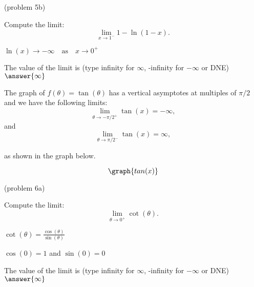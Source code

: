 \documentclass[handout]{ximera}
\begin{document}
\begin{problem}(problem 5b)
  
	Compute the limit:
  \[
  \lim_{x \to {1^-}} 1 - \ln(1-x).
  \]
		\begin{hint}
		  $\ln(x) \to -\infty \quad \text{as} \quad x \to 0^+$
		\end{hint}	
		The value of the limit is
		(type infinity for $\infty$, -infinity for $-\infty$ or DNE)
		 $\answer{\infty}$
		
\end{problem}

\begin{example}[example 6]
The graph of $f(\theta) = \tan(\theta)$ has a vertical asymptotes at multiples of $\pi/2$ and
we have the following limits: 
\[
\lim_{\theta\to -\pi/2^+} \tan(x) = -\infty,
\]
and
\[
\lim_{\theta\to \pi/2^-} \tan(x) = \infty,
\]

as shown in the graph below.
		
			
\[
\graph{tan(x)}
\]
\end{example}

\begin{problem}(problem 6a)
  
	Compute the limit:
  \[
  \lim_{\theta \to {0^+}} \cot(\theta).
  \]
		\begin{hint}
		  $\cot(\theta) = \frac{\cos(\theta)}{\sin(\theta)}$
		\end{hint}	
		\begin{hint}
		  $\cos(0) = 1$ and $\sin(0) = 0$
		\end{hint}
		
		The value of the limit is
		(type infinity for $\infty$, -infinity for $-\infty$ or DNE)
		 $\answer{\infty}$
		
\end{problem}
\end{document}
